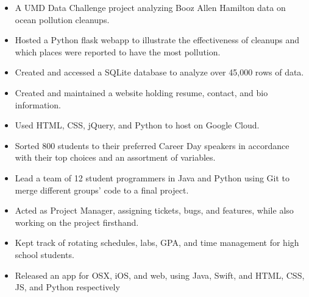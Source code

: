 \documentclass[11pt]{article}
\begin{document}
\vspace{2mm}
{\fontsize{10}{12}\robotocondlight
\begin{itemize}[noitemsep,nolistsep]
    \item A UMD Data Challenge project analyzing Booz Allen Hamilton data on ocean pollution cleanups. 
    \item Hosted a {\robotocond Python flask} webapp to illustrate the effectiveness of cleanups and which places were reported to have the most pollution. 
    \item Created and accessed a {\robotocond SQLite} database to analyze over 45,000 rows of data.
\end{itemize}
{\fontsize{10}{12}\robotocondlight
\begin{itemize}[noitemsep,nolistsep]
    \item Created and maintained a website holding resume, contact, and bio information.
    \item Used {\robotocond HTML}, {\robotocond CSS}, {\robotocond jQuery}, and {\robotocond Python} to host on {\robotocond Google Cloud}.
\end{itemize}
\begin{itemize}[noitemsep,nolistsep]
    \item Sorted 800 students to their preferred Career Day speakers in accordance with their top choices and an assortment of variables.
    \item Lead a team of 12 student programmers in {\robotocond Java} and {\robotocond Python} using {\robotocond Git} to merge different groups’ code to a final project.
    \item Acted as Project Manager, assigning tickets, bugs, and features, while also working on the project firsthand.
\end{itemize}
\begin{itemize}[noitemsep,nolistsep]
    \item Kept track of rotating schedules, labs, GPA, and time management for high school students. 
    \item Released an app for OSX, iOS, and web, using {\robotocond Java}, {\robotocond Swift},
     and {\robotocond HTML}, {\robotocond CSS}, {\robotocond JS}, and {\robotocond Python} respectively
\end{itemize}
}}
\end{document}

